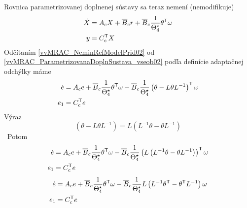 ﻿\documentclass[a4paper, 10pt, ]{article}
\begin{document}
Rovnica parametrizovanej doplnenej sústavy sa teraz nemení (nemodifikuje)
\begin{subequations} \label{vvMRAC_ParametrizovanaDoplnSustava_vseob02}
	\begin{align}
		\dot{X}
		&=
		A_c
		X
		+
		\overline{B}_c
		r
		+
		\overline{B}_c
		\frac{1}{\Theta_4^\star}
		\theta^{\mathsf{T}}
		\omega
\\
		y
		&=
		C_c^{\mathsf{T}}
		X
	\end{align}
\end{subequations}
Odčítaním \eqref{vvMRAC_NeminRefModelPrid02} od \eqref{vvMRAC_ParametrizovanaDoplnSustava_vseob02} podľa definície adaptačnej odchýlky máme
\begin{subequations} \label{vvMRAC_adaptOdchSS_MDO01}
	\begin{align}
		\dot{e}
		&=
		A_c
		e
		+
		\overline{B}_c
		\frac{1}{\Theta_4^\star}
		\theta^{\mathsf{T}}
		\omega
		-
		\overline{B}_c
		\frac{1}{\Theta_4^\star}
			\left(
				\theta
				-
				L
				\theta
				L^{-1}
			\right)^{\mathsf{T}}
		\omega
\\
		e_1
		&=
		C_c^{\mathsf{T}}
		e
	\end{align}
\end{subequations}
Výraz
\begin{equation}
	\left(
	\theta
	-
	L
	\theta
	L^{-1}
	\right)
	=
	L
	\left(
	L^{-1}
	\theta
	-
	\theta
	L^{-1}
	\right)
\end{equation}\
Potom
\begin{subequations} \label{vvMRAC_adaptOdchSS_MDO02}
	\begin{align}
		\dot{e}
		&=
		A_c
		e
		+
		\overline{B}_c
		\frac{1}{\Theta_4^\star}
		\theta^{\mathsf{T}}
		\omega
		-
		\overline{B}_c
		\frac{1}{\Theta_4^\star}
			\left(
				L
				\left(
					L^{-1}
					\theta
					-
					\theta
					L^{-1}
				\right)
			\right)^{\mathsf{T}}
		\omega
		\\
		e_1
		&=
		C_c^{\mathsf{T}}
		e
	\end{align}
\end{subequations}
\begin{subequations} \label{vvMRAC_adaptOdchSS_MDO03}
	\begin{align}
		\dot{e}
		&=
		A_c
		e
		+
		\overline{B}_c
		\frac{1}{\Theta_4^\star}
		\theta^{\mathsf{T}}
		\omega
		-
		\overline{B}_c
		\frac{1}{\Theta_4^\star}
		L
			\left(
				L^{-1}
				\theta^{\mathsf{T}}
				-
				\theta^{\mathsf{T}}
				L^{-1}
				\right)
		\omega
		\\
		e_1
		&=
		C_c^{\mathsf{T}}
		e
	\end{align}
\end{subequations}
\end{document}
